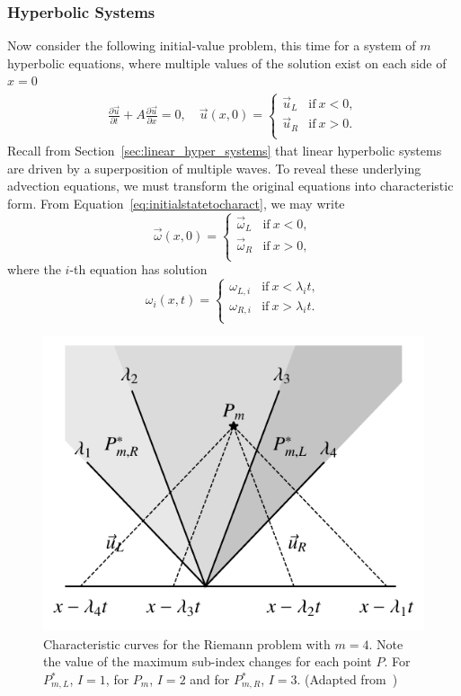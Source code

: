 \subsubsection{Hyperbolic Systems}
Now consider the following initial-value problem, this time for a system of $m$ hyperbolic equations, where multiple values of the solution exist on each side of $x=0$
\begin{align}
	\frac{\partial \vec u}{\partial t} +A \frac{\partial \vec u}{\partial x} = 0, \quad \vec u(x,0) = 
	\begin{cases}
		\vec u_L & \text{if}~x<0,\\
		\vec u_R & \text{if}~x>0.\\
	\end{cases}
	\label{eq:ivp_linearsys}
\end{align}
Recall from Section~\ref{sec:linear_hyper_systems} that linear hyperbolic systems are driven by a superposition of multiple waves. To reveal these underlying advection equations, we must transform the original equations into characteristic form. From Equation~\ref{eq:initialstatetocharact}, we may write
\begin{equation}
	\vec \omega(x,0) = 
	\begin{cases}
		\vec \omega_L & \text{if}~x<0,\\
		\vec \omega_R & \text{if}~x>0,\\
	\end{cases}
	\label{eq:ivp_linearsys}
\end{equation}
where the $i$-th equation has solution
\begin{equation}
	\omega_i(x,t) = 
	\begin{cases}
		\omega_{L,i} &\text{if}~x<\lambda_i t, \\
		\omega_{R,i} &\text{if}~x>\lambda_i t. \\
	\end{cases}
\end{equation}
\begin{figure}[htbp]
	\centering
	\includegraphics[width=0.5\linewidth]{Pictures/riem_lsys_characteristics}
	\caption{Characteristic curves for the Riemann problem with $m=4$. Note the value of the maximum sub-index changes for each point $P$. For $P_{m,L}^*$, $I=1$, for $P_{m}$, $I=2$ and for $P_{m,R}^*$, $I=3$. (Adapted from~\cite{levequeFiniteVolumeMethods2002})}
	\label{fig:characteristics_riemann}
\end{figure}
